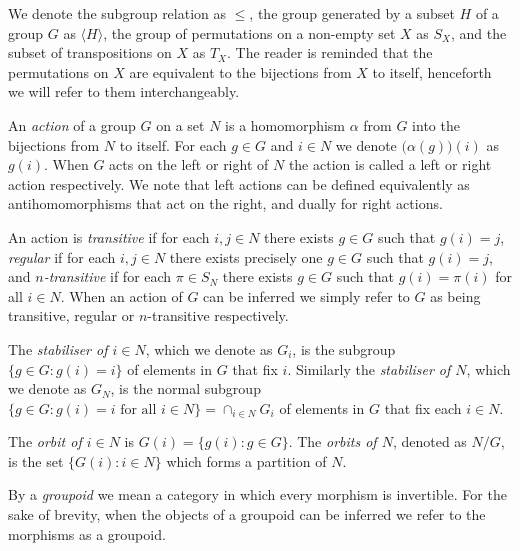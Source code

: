 	
	We denote the subgroup relation as $\leq$, the group generated by a subset $H$ of a group $G$ as $\langle{H}\rangle$, the group of permutations on a non-empty set $X$ as $S_X$, and the subset of transpositions on $X$ as $T_X$. The reader is reminded that the permutations on $X$ are equivalent to the bijections from $X$ to itself, henceforth we will refer to them interchangeably.
	
	An \textit{action} of a group $G$ on a set $N$ is a homomorphism $\alpha$ from $G$ into the bijections from $N$ to itself. For each $g \in G$ and $i \in N$ we denote $\bigl(\alpha(g)\bigr)(i)$ as $g(i)$. When $G$ acts on the left or right of $N$ the action is called a left or right action respectively. We note that left actions can be defined equivalently as antihomomorphisms that act on the right, and dually for right actions.
	
	An action is \textit{transitive} if for each $i, j \in N$ there exists $g \in G$ such that $g(i) = j$, \textit{regular} if for each $i, j \in N$ there exists precisely one $g \in G$ such that $g(i) = j$, and \textit{$n$-transitive} if for each $\pi \in S_N$ there exists $g \in G$ such that $g(i) = \pi(i)$ for all $i \in N$. When an action of $G$ can be inferred we simply refer to $G$ as being transitive, regular or $n$-transitive respectively.
	
	The \textit{stabiliser of $i \in N$}, which we denote as $G_i$, is the subgroup $\{g \in G: g(i) = i\}$ of elements in $G$ that fix $i$. Similarly the \textit{stabiliser of $N$}, which we denote as $G_N$, is the normal subgroup $\{g \in G: g(i) = i \text{ for all } i \in N\} = \cap_{i \in N}G_i$ of elements in $G$ that fix each $i \in N$.
	
	The \textit{orbit of $i \in N$} is $G(i) = \{g(i): g \in G\}$. The \textit{orbits of $N$}, denoted as $N/G$, is the set $\{G(i): i \in N\}$ which forms a partition of $N$.
	
	By a \textit{groupoid} we mean a category in which every morphism is invertible. For the sake of brevity, when the objects of a groupoid can be inferred we refer to the morphisms as a groupoid. 